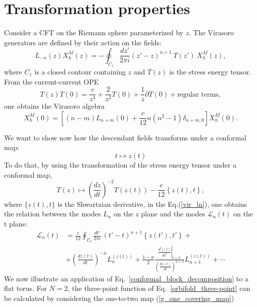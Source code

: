 \documentclass[a4paper,11pt]{article}
\begin{document}
\appendix
\section{Transformation properties}\label{app_ward}

Consider a CFT on the Riemann sphere parameterized by $z$.
The Virasoro generators are defined by their action on the fields:
\begin{equation}
\label{vir_ln}
 L_{-n}(z)X^{M}_h(z)=-\oint_{C_{z}}\frac{dz'}{2\pi i}(z'-z)^{n+1}~T(z')~X^{M}_h(z),
\end{equation}
where $C_{z}$ is a closed contour containing $z$ and $T(z)$ is the stress energy tensor. 
From the current-current OPE
\begin{equation}
T(z) T(0)= \frac{c}{z^4}+ \frac{2}{z^2} T(0)+\frac{1}{z}\partial T (0)+\text{regular terms},
\end{equation} 
one obtains the  Virasoro algebra
\begin{equation}
 [L_n(0), L_{m}(0)]X^{M}_h(0) =\left[(n-m) L_{n+m}(0)+\frac{c}{12}n(n^2-1)\delta_{n+m, 0}\right]X^{M}_h(0).
\end{equation}

We want to show now how the descendant fields transforms under a conformal map:
\begin{equation}
t \mapsto z(t)
\end{equation}
To do that, by using the transformation of the stress energy tensor under a conformal map,
\begin{equation}
T(z)\mapsto \left(\frac{d z}{d t}\right)^{-2} T(z(t))-\frac{c}{12}\left\{z(t),t\right\},
\end{equation}
where $\{z(t),t\}$ is the Shwartzian derivative,  in the Eq.(\ref{vir_ln}), one obtains the relation between the modes $L_{n}$ on the $z$ plane and the modes $\mathcal{L}_n(t)$ on the t plane:
\begin{equation}\label{gengen}
\begin{aligned}
 \mathcal{L}_{n}(t)&=\frac{c}{12} \oint_{\mathcal{C}_t}\frac{d t'}{2\pi i}\, (t'-t)^{n+1}\left\{z(t'),t'\right\} +\\
 & +\left(\frac{d z(t)}{d t}\right)^{-n} L_n^{(z(t))}
 +\frac{1-n}{2}\frac{\left.\frac{d^2 z(t)}{d t^2}\right|_{t=t'}}{\left(\frac{d z(t)}{d t}\right)^{n+2}}L_{n+1}^{(z(t))}+\cdots
 \end{aligned}
\end{equation}
We now illustrate an application of Eq.~\eqref{conformal_block_decomposition} to a flat torus. For $N=2$, the three-point function of Eq.~\eqref{orbifold_three-point} 
can be calculated by considering the  one-to-two map (\ref{g_one_covering_map})
\end{document}

